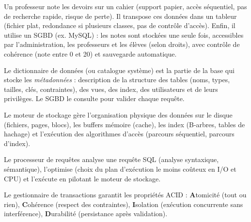 \documentclass[11pt]{article}
\newcommand{\cle}[1]{{\popxbold\color{popdark}#1}}
\newcounter{popsec}
\newcounter{popsub}
\newcommand{\courssub}[1]{%
  \stepcounter{popsub}%
  \par\vspace{9pt}\noindent{\popxbold\fontsize{11.5}{13}\selectfont\color{popink}{\color{poporange}\thepopsec.\thepopsub}\hspace{6pt}#1}\par\nopagebreak\vspace{4pt}
}
\begin{document}
\begin{exemplebox}
Un professeur note les devoirs sur un cahier (support papier, accès séquentiel, pas de recherche rapide, risque de perte). Il transpose ces données dans un tableur (fichier plat, redondance si plusieurs classes, pas de contrôle d'accès). Enfin, il utilise un SGBD (ex. MySQL) : les notes sont stockées une seule fois, accessibles par l'administration, les professeurs et les élèves (selon droits), avec contrôle de cohérence (note entre 0 et 20) et sauvegarde automatique.
\end{exemplebox}

\courssub{Composants d'un SGBD}

\begin{definition}
Le \cle{dictionnaire de données} (ou catalogue système) est la partie de la base qui stocke les \emph{métadonnées} : description de la structure des tables (noms, types, tailles, clés, contraintes), des vues, des index, des utilisateurs et de leurs privilèges. Le SGBD le consulte pour valider chaque requête.
\end{definition}

\begin{definition}
Le \cle{moteur de stockage} gère l'organisation physique des données sur le disque (fichiers, pages, blocs), les buffers mémoire (cache), les index (B-arbres, tables de hachage) et l'exécution des algorithmes d'accès (parcours séquentiel, parcours d'index).
\end{definition}

\begin{definition}
Le \cle{processeur de requêtes} analyse une requête SQL (analyse syntaxique, sémantique), l'optimise (choix du plan d'exécution le moins coûteux en I/O et CPU) et l'exécute en pilotant le moteur de stockage.
\end{definition}

\begin{definition}
Le \cle{gestionnaire de transactions} garantit les propriétés \cle{ACID} : \textbf{A}tomicité (tout ou rien), \textbf{C}ohérence (respect des contraintes), \textbf{I}solation (exécution concurrente sans interférence), \textbf{D}urabilité (persistance après validation).
\end{definition}
\end{document}
